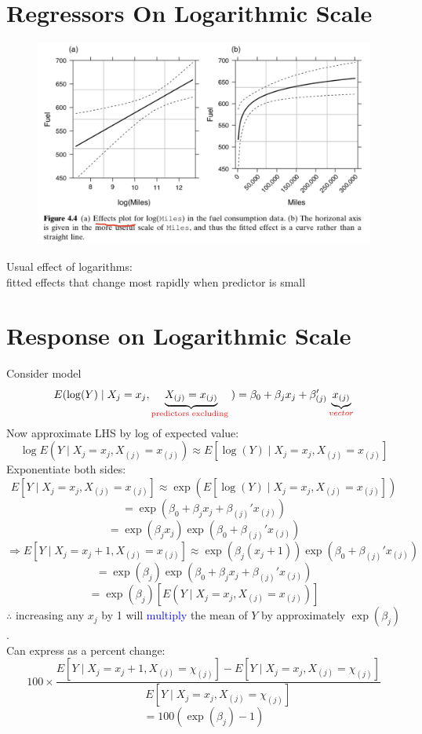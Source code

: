 \documentclass[14pt]{extarticle}
\begin{document}
\section*{Regressors On Logarithmic Scale}

\begin{figure}[H]
    \centering
    \includegraphics[width=1\textwidth]{fig6.png}
\end{figure}
\noindent
Usual effect of logarithms: \\
\quad fitted effects that change most rapidly when predictor is small

\section*{Response on Logarithmic Scale}

\noindent
Consider model
\[
E(\log(Y) \mid X_j = x_j, \underbrace{X_{(j)} = x_{(j)}}_{\textcolor{red}{\text{predictors excluding }}}) = \beta_0 + \beta_j x_j + \beta'_{(j)} \underbrace{x_{(j)}}_{\textcolor{red}{vector}}
\]
Now approximate LHS by log of expected value:
\[
\log E(Y \mid X_j = x_j, X_{(j)} = x_{(j)}) \approx E \left[ \log(Y) \mid X_j = x_j, X_{(j)} = x_{(j)} \right]
\]
Exponentiate both sides:
\[
E \left[ Y \mid X_j = x_j, X_{(j)} = x_{(j)} \right] \approx \exp \left( E \left[ \log(Y) \mid X_j = x_j, X_{(j)} = x_{(j)} \right] \right)
\]
\[
= \exp \left( \beta_0 + \beta_j x_j + \beta_{(j)}' x_{(j)} \right)
\]
\[
= \exp(\beta_j x_j) \exp \left( \beta_0 + \beta_{(j)}' x_{(j)} \right)
\]
\[
\Rightarrow E \left[ Y \mid X_j = x_j + 1, X_{(j)} = x_{(j)} \right] \approx \exp(\beta_j (x_j + 1)) \exp \left( \beta_0 + \beta_{(j)}' x_{(j)} \right)
\]
\[
= \exp(\beta_j) \exp(\beta_0 + \beta_j x_j + \beta_{(j)}' x_{(j)})
\]
\[
= \exp(\beta_j) \left[ E \left( Y \mid X_j = x_j, X_{(j)} = x_{(j)} \right) \right]
\]
\noindent
$\therefore$ increasing any $x_j$ by 1 will \textcolor{blue}{multiply} the mean of $Y$ by approximately $\exp(\beta_j)$.\\
Can express as a percent change:
\[
100 \times \frac{E \left[ Y \mid X_j = x_j + 1, X_{(j)} = \chi_{(j)} \right] - E \left[ Y \mid X_j = x_j, X_{(j)} = \chi_{(j)} \right]}{E \left[ Y \mid X_j = x_j, X_{(j)} = \chi_{(j)} \right]}
\]
\[
= 100 \left( \exp(\beta_j) - 1 \right)
\]
\end{document}
